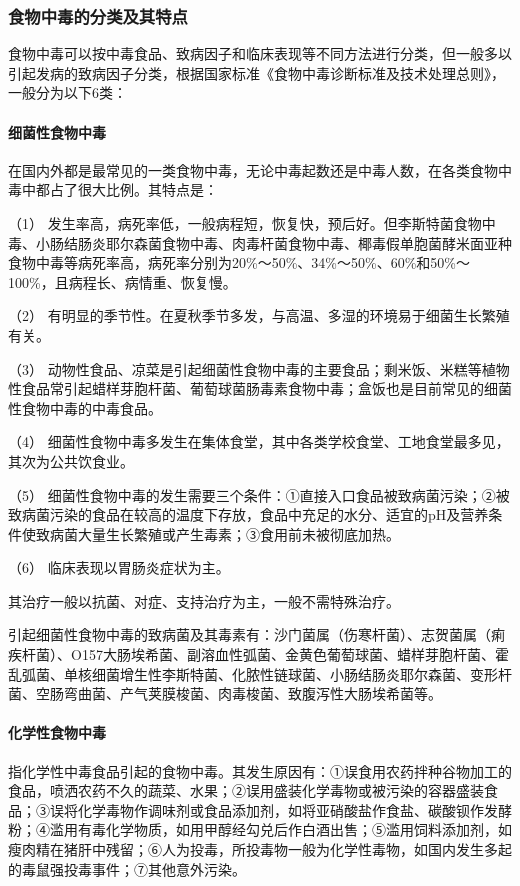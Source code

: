 \subsubsection{食物中毒的分类及其特点}

食物中毒可以按中毒食品、致病因子和临床表现等不同方法进行分类，但一般多以引起发病的致病因子分类，根据国家标准《食物中毒诊断标准及技术处理总则》，一般分为以下6类：

\paragraph{细菌性食物中毒}

在国内外都是最常见的一类食物中毒，无论中毒起数还是中毒人数，在各类食物中毒中都占了很大比例。其特点是：

（1）
发生率高，病死率低，一般病程短，恢复快，预后好。但李斯特菌食物中毒、小肠结肠炎耶尔森菌食物中毒、肉毒杆菌食物中毒、椰毒假单胞菌酵米面亚种食物中毒等病死率高，病死率分别为20\%～50\%、34\%～50\%、60\%和50\%～100\%，且病程长、病情重、恢复慢。

（2）
有明显的季节性。在夏秋季节多发，与高温、多湿的环境易于细菌生长繁殖有关。

（3）
动物性食品、凉菜是引起细菌性食物中毒的主要食品；剩米饭、米糕等植物性食品常引起蜡样芽胞杆菌、葡萄球菌肠毒素食物中毒；盒饭也是目前常见的细菌性食物中毒的中毒食品。

（4）
细菌性食物中毒多发生在集体食堂，其中各类学校食堂、工地食堂最多见，其次为公共饮食业。

（5）
细菌性食物中毒的发生需要三个条件：①直接入口食品被致病菌污染；②被致病菌污染的食品在较高的温度下存放，食品中充足的水分、适宜的pH及营养条件使致病菌大量生长繁殖或产生毒素；③食用前未被彻底加热。

（6） 临床表现以胃肠炎症状为主。

其治疗一般以抗菌、对症、支持治疗为主，一般不需特殊治疗。

引起细菌性食物中毒的致病菌及其毒素有：沙门菌属（伤寒杆菌）、志贺菌属（痢疾杆菌）、O157大肠埃希菌、副溶血性弧菌、金黄色葡萄球菌、蜡样芽胞杆菌、霍乱弧菌、单核细菌增生性李斯特菌、化脓性链球菌、小肠结肠炎耶尔森菌、变形杆菌、空肠弯曲菌、产气荚膜梭菌、肉毒梭菌、致腹泻性大肠埃希菌等。

\paragraph{化学性食物中毒}

指化学性中毒食品引起的食物中毒。其发生原因有：①误食用农药拌种谷物加工的食品，喷洒农药不久的蔬菜、水果；②误用盛装化学毒物或被污染的容器盛装食品；③误将化学毒物作调味剂或食品添加剂，如将亚硝酸盐作食盐、碳酸钡作发酵粉；④滥用有毒化学物质，如用甲醇经勾兑后作白酒出售；⑤滥用饲料添加剂，如瘦肉精在猪肝中残留；⑥人为投毒，所投毒物一般为化学性毒物，如国内发生多起的毒鼠强投毒事件；⑦其他意外污染。

